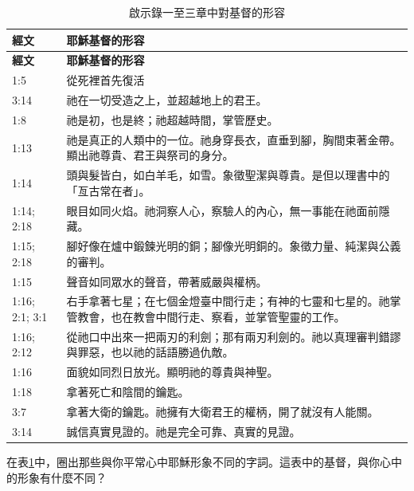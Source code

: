 {
\begin{longtable}{p{1.6cm} p{7.3cm}}
\caption{啟示錄一至三章中對基督的形容}
\label{tab:christ-revelation-1-3} \\
\toprule
\textbf{經文} & \textbf{耶穌基督的形容} \\
\midrule
\endfirsthead

\toprule
\textbf{經文} & \textbf{耶穌基督的形容} \\
\midrule
\endhead

\bottomrule
\endfoot

\bottomrule
\endlastfoot

1:5
& 從死裡首先復活 \\
\midrule[0.2pt]
3:14
& 祂在一切受造之上，並超越地上的君王。 \\
\midrule[0.2pt]
1:8
& 祂是初，也是終；祂超越時間，掌管歷史。 \\
\midrule[0.2pt]
1:13
& 祂是真正的人類中的一位。祂身穿長衣，直垂到腳，胸間束著金帶。顯出祂尊貴、君王與祭司的身分。 \\
\midrule[0.2pt]
1:14
& 頭與髮皆白，如白羊毛，如雪。象徵聖潔與尊貴。是但以理書中的「亙古常在者」。 \\
\midrule[0.2pt]
1:14; 2:18
& 眼目如同火焰。祂洞察人心，察驗人的內心，無一事能在祂面前隱藏。 \\
\midrule[0.2pt]
1:15; 2:18
& 腳好像在爐中鍛鍊光明的銅；腳像光明銅的。象徵力量、純潔與公義的審判。 \\
\midrule[0.2pt]
1:15
& 聲音如同眾水的聲音，帶著威嚴與權柄。 \\
\midrule[0.2pt]
1:16; 2:1; 3:1
& 右手拿著七星；在七個金燈臺中間行走；有神的七靈和七星的。祂掌管教會，也在教會中間行走、察看，並掌管聖靈的工作。 \\
\midrule[0.2pt]
1:16; 2:12
& 從祂口中出來一把兩刃的利劍；那有兩刃利劍的。祂以真理審判錯謬與罪惡，也以祂的話語勝過仇敵。 \\
\midrule[0.2pt]
1:16
& 面貌如同烈日放光。顯明祂的尊貴與神聖。 \\
\midrule[0.2pt]
1:18
& 拿著死亡和陰間的鑰匙。 \\
\midrule[0.2pt]
3:7
& 拿著大衛的鑰匙。祂擁有大衛君王的權柄，開了就沒有人能關。 \\
\midrule[0.2pt]
3:14
& 誠信真實見證的。祂是完全可靠、真實的見證。 \\
\end{longtable}
}

\begin{ReaderQuestion}
在表\ref{tab:christ-revelation-1-3}中，圈出那些與你平常心中耶穌形象不同的字詞。這表中的基督，與你心中的形象有什麼不同？
\end{ReaderQuestion}

